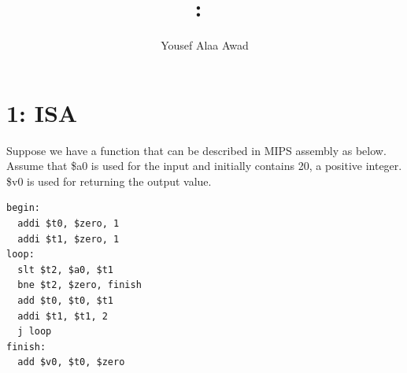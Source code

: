 \documentclass{article}
\title{
    \vspace{2in}
    \textmd{\textbf{\hmwkClass:\ \hmwkTitle}}\\
    \normalsize\vspace{0.1in}
}
\author{Yousef Alaa Awad}
\begin{document}
\maketitle
\pagebreak

\section{1: ISA}
Suppose we have a function that can be described in MIPS assembly as below. Assume that \$a0 is used for the input and initially contains 20, a positive integer. \$v0 is used for returning the output value.
\begin{center}
	\begin{minipage}{0.3\textwidth}
		\begin{lstlisting}[style=mipsStyle]
begin:
  addi $t0, $zero, 1
  addi $t1, $zero, 1
loop:
  slt $t2, $a0, $t1
  bne $t2, $zero, finish
  add $t0, $t0, $t1
  addi $t1, $t1, 2
  j loop
finish:
  add $v0, $t0, $zero
\end{lstlisting}
	\end{minipage}
\end{center}
\end{document}
